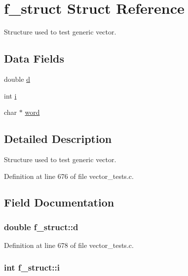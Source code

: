 \hypertarget{structf__struct}{\section{f\-\_\-struct Struct Reference}
\label{structf__struct}
}


Structure used to test generic vector.  


\subsection*{Data Fields}
\begin{DoxyCompactItemize}
\item 
double \hyperlink{structf__struct_aabfd173ef817f4c258a9e55aaa2ec9cf}{d}
\item 
int \hyperlink{structf__struct_a87df300d9aa87b7df7cba13e548c948f}{i}
\item 
char $\ast$ \hyperlink{structf__struct_aa8f65f08c5e6180da916f9001438eab5}{word}
\end{DoxyCompactItemize}


\subsection{Detailed Description}
Structure used to test generic vector. 



Definition at line 676 of file vector\-\_\-tests.\-c.



\subsection{Field Documentation}
\hypertarget{structf__struct_aabfd173ef817f4c258a9e55aaa2ec9cf}{
\subsubsection[{d}]{\setlength{\rightskip}{0pt plus 5cm}double f\-\_\-struct\-::d}}\label{structf__struct_aabfd173ef817f4c258a9e55aaa2ec9cf}


Definition at line 678 of file vector\-\_\-tests.\-c.

\hypertarget{structf__struct_a87df300d9aa87b7df7cba13e548c948f}{
\subsubsection[{i}]{\setlength{\rightskip}{0pt plus 5cm}int f\-\_\-struct\-::i}}\label{structf__struct_a87df300d9aa87b7df7cba13e548c948f}


